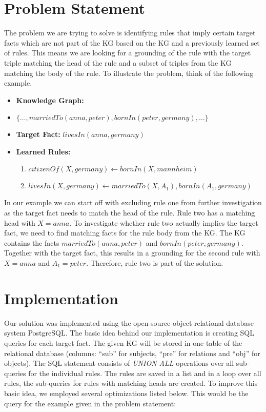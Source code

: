 \documentclass[english]{lni}
\begin{document}
\section{Problem Statement}
The problem we are trying to solve is identifying rules that imply certain target facts which are not part of the KG based on the KG and a previously learned set of rules. This means we are looking for a grounding of the rule with the target triple matching the head of the rule and a subset of triples from the KG matching the body of the rule. To illustrate the problem, think of the following example.

\begin{itemize}
  \item \textbf{Knowledge Graph:}
  \item[] \(\{…, marriedTo(anna, peter), bornIn(peter, germany), …\}\)
  \item \textbf{Target Fact:} \(livesIn(anna, germany)\)
  \item \textbf{Learned Rules:}
  \begin{enumerate}
      \item \(citizenOf(X, germany) \leftarrow bornIn(X, mannheim)\)
      \item \(livesIn(X, germany) \leftarrow marriedTo(X, A_1), bornIn(A_1, germany)\)
  \end{enumerate}
\end{itemize}

In our example we can start off with excluding rule one from further investigation as the target fact needs to match the head of the rule. Rule two has a matching head with \(X = anna\). To investigate whether rule two actually implies the target fact, we need to find matching facts for the rule body from the KG. The KG contains the facts \(marriedTo(anna, peter)\) and \(bornIn(peter, germany)\). Together with the target fact, this results in a grounding for the second rule with \(X = anna\) and \(A_1 = peter\). Therefore, rule two is part of the solution.

\section{Implementation}

Our solution was implemented using the open-source object-relational database system PostgreSQL. The basic idea behind our implementation is creating SQL queries for each target fact. The given KG will be stored in one table of the relational database (columns: “sub” for subjects, “pre” for relations and “obj” for objects). The SQL statement consists of \textit{UNION ALL} operations over all sub-queries for the individual rules. The rules are saved in a list and in a loop over all rules, the sub-queries for rules with matching heads are created. To improve this basic idea, we employed several optimizations listed below. This would be the query for the example given in the problem statement:
\end{document}
